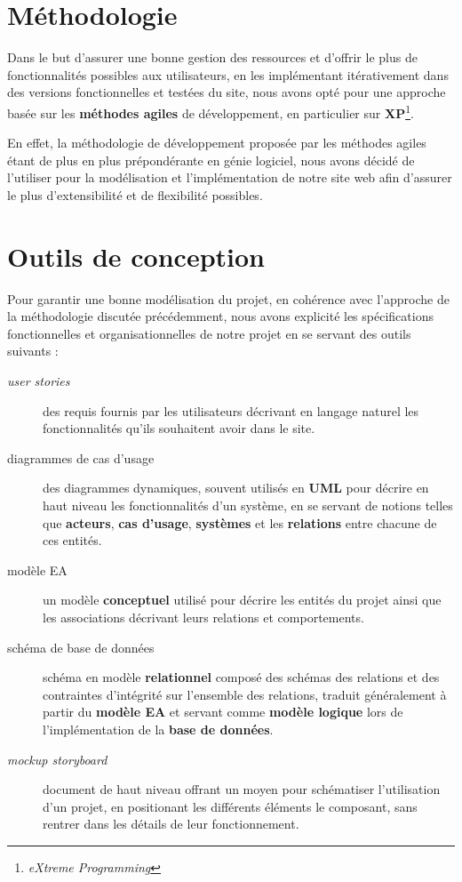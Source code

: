 \documentclass[a4paper,12pt]{report}
\theoremstyle{break}
\theoremstyle{break}
\theoremstyle{break}
\theoremstyle{break}
\theoremstyle{definition}
\theoremstyle{remark}
\begin{document}
\section{Méthodologie}
Dans le but d'assurer une bonne gestion des ressources et d'offrir le plus de fonctionnalités possibles aux utilisateurs, en les implémentant itérativement dans des versions fonctionnelles et testées du site, nous avons opté pour une approche basée sur les \textbf{méthodes agiles} de développement, en particulier sur \textbf{XP}\footnote{\textit{eXtreme Programming}}.

En effet, la méthodologie de développement proposée par les méthodes agiles étant de plus en plus prépondérante en génie logiciel, nous avons décidé de l'utiliser pour la modélisation et l'implémentation de notre site web afin d'assurer le plus d'extensibilité et de flexibilité possibles.
\section{Outils de conception}
Pour garantir une bonne modélisation du projet, en cohérence avec l'approche de la méthodologie discutée précédemment, nous avons explicité les spécifications fonctionnelles et organisationnelles de notre projet en se servant des outils suivants :
\begin{description}
  \item[\textit{user stories}]{des requis fournis par les utilisateurs décrivant en langage naturel les fonctionnalités qu'ils souhaitent avoir dans le site.}
  \item[diagrammes de cas d'usage]{des diagrammes dynamiques, souvent utilisés en \textbf{UML} pour décrire en haut niveau les fonctionnalités d'un système, en se servant de notions telles que \textbf{acteurs}, \textbf{cas d'usage}, \textbf{systèmes} et les \textbf{relations} entre chacune de ces entités.}
  \item[modèle EA]{un modèle \textbf{conceptuel} utilisé pour décrire les entités du projet ainsi que les associations décrivant leurs relations et comportements.}
  \item[schéma de base de données]{schéma en modèle \textbf{relationnel} composé des schémas des relations et des contraintes d'intégrité sur l'ensemble des relations, traduit généralement à partir du \textbf{modèle EA} et servant comme \textbf{modèle logique} lors de l'implémentation de la \textbf{base de données}.}
  \item[\textit{mockup storyboard}]{document de haut niveau offrant un moyen pour schématiser l'utilisation d'un projet, en positionant les différents éléments le composant, sans rentrer dans les détails de leur fonctionnement.}
\end{description}
\end{document}
